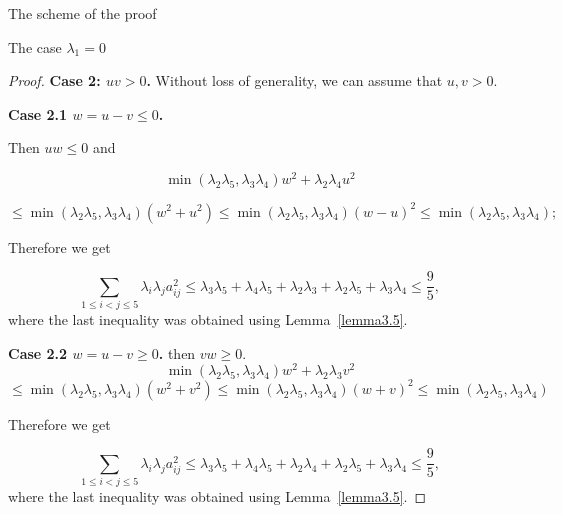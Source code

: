 \documentclass[12pt]{article}
\begin{document}
\begin{section}{The scheme of the proof}
\begin{section}{The case  \texorpdfstring{$\lambda_{1} = 0$}{Lg}}
\begin{proof}
    \textbf{Case 2: $uv > 0$.}
    Without loss of generality, we can assume that 
    $u,v>0$.
    
    \textbf{Case 2.1 $w = u-v \leq 0$.}
    
    Then $ uw\leq 0$ and  

    $$
        \min(\lambda_{2}\lambda_{5},\lambda_{3}\lambda_{4} )w^{2} + \lambda_{2}\lambda_{4}u^{2}
        $$
        
        $$
        \leq \min(\lambda_{2}\lambda_{5},\lambda_{3}\lambda_{4} )(w^{2} + u^{2}) \leq \min(\lambda_{2}\lambda_{5},\lambda_{3}\lambda_{4} )(w - u)^{2} \leq \min(\lambda_{2}\lambda_{5},\lambda_{3}\lambda_{4} );
    $$

     Therefore we get
    
    $$
        \sum_{1\leq i < j\leq 5}\lambda_{i}\lambda_{j} a_{ij}^{2} \leq \lambda_{3}\lambda_{5} + \lambda_{4}\lambda_{5} + \lambda_{2}\lambda_{3} + \lambda_{2}\lambda_{5} + \lambda_{3}\lambda_{4}\leq \frac{9}{5},
    $$
    where the last inequality was obtained using Lemma~\ref{lemma3.5}.

    \textbf{Case  2.2 $w = u-v \geq 0$.} then $vw\geq 0.$
    $$
        \min(\lambda_{2}\lambda_{5},\lambda_{3}\lambda_{4} )w^{2} + \lambda_{2}\lambda_{3}v^{2}     
        $$
        $$\leq \min(\lambda_{2}\lambda_{5},\lambda_{3}\lambda_{4} )(w^{2} + v^{2}) \leq \min(\lambda_{2}\lambda_{5},\lambda_{3}\lambda_{4} )(w + v)^{2} \leq \min(\lambda_{2}\lambda_{5},\lambda_{3}\lambda_{4} )
    $$

     Therefore we get
    
    $$
        \sum_{1\leq i < j\leq 5}\lambda_{i}\lambda_{j} a_{ij}^{2} \leq \lambda_{3}\lambda_{5} + \lambda_{4}\lambda_{5} + \lambda_{2}\lambda_{4} + \lambda_{2}\lambda_{5} + \lambda_{3}\lambda_{4}\leq \frac{9}{5},
    $$
    where the last inequality was obtained using Lemma~\ref{lemma3.5}.

\end{proof}
    
\end{section}

\end{section}
\end{document}
